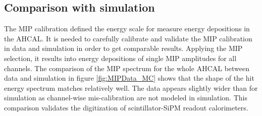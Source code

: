 \subsection{Comparison with simulation}

The MIP calibration defined the energy scale for measure energy depositions in the AHCAL. It is needed to carefully calibrate and validate the MIP calibration in data and simulation in order to get comparable results. Applying the MIP selection, it results into energy depositions of single MIP amplitudes for all channels. The comparison of the MIP spectrum for the whole AHCAL between data and simulation in figure \ref{fig:MIPData_MC} shows that the shape of the hit energy spectrum matches relatively well. The data appears slightly wider than for simulation as channel-wise mis-calibration are not modeled in simulation. This comparison validates the digitization of scintillator-SiPM readout calorimeters.

